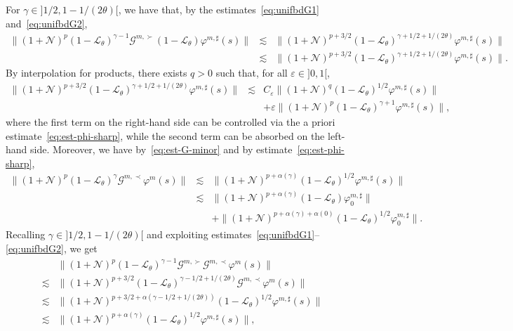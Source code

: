 \documentclass[10pt]{article}
\begin{document}
For $\gamma \in] 1 / 2, 1 - 1 / (2 \theta) [$, we have that, by the
estimates~{\eqref{eq:unifbdG1}} and~{\eqref{eq:unifbdG2}},
\begin{eqnarray*}
  \| (1 +\mathcal{N})^p (1 -\mathcal{L}_{\theta})^{\gamma - 1} \mathcal{G}^{m,
  \succ} (1 -\mathcal{L}_{\theta}) \varphi^{m, \sharp} (s) \| & \lesssim & \|
  (1 +\mathcal{N})^{p + 3 / 2} (1 -\mathcal{L}_{\theta})^{\gamma + 1 / 2 + 1 /
  (2 \theta)} \varphi^{m, \sharp} (s) \|\\
  & \lesssim & \| (1 +\mathcal{N})^{p + 3 / 2} (1
  -\mathcal{L}_{\theta})^{\gamma + 1 / 2 + 1 / (2 \theta)} \varphi^{m, \sharp}
  (s) \| .
\end{eqnarray*}
By interpolation for products, there exists $q > 0$ such that, for all
$\varepsilon \in] 0, 1 [$,
\[ \begin{array}{lll}
     \| (1 +\mathcal{N})^{p + 3 / 2} (1 -\mathcal{L}_{\theta})^{\gamma + 1 / 2
     + 1 / (2 \theta)} \varphi^{m, \sharp} (s) \| & \lesssim & C_{\varepsilon}
     \| (1 +\mathcal{N})^q (1 -\mathcal{L}_{\theta})^{1 / 2} \varphi^{m,
     \sharp} (s) \|\\
     &  & + \varepsilon \| (1 +\mathcal{N})^p (1
     -\mathcal{L}_{\theta})^{\gamma + 1} \varphi^{m, \sharp} (s) \|,
   \end{array} \]
where the first term on the right-hand side can be controlled via the a priori
estimate~{\eqref{eq:est-phi-sharp}}, while the second term can be absorbed on
the left-hand side. Moreover, we have by~{\eqref{eq:est-G-minor}} and by
estimate~{\eqref{eq:est-phi-sharp}},
\[ \begin{array}{lll}
     \| (1 +\mathcal{N})^p (1 -\mathcal{L}_{\theta})^{\gamma} \mathcal{G}^{m,
     \prec} \varphi^m (s) \| & \lesssim & \| (1 +\mathcal{N})^{p + \alpha
     (\gamma)} (1 -\mathcal{L}_{\theta})^{1 / 2} \varphi^{m, \sharp} (s) \|\\
     & \lesssim & \| (1 +\mathcal{N})^{p + \alpha (\gamma)} (1
     -\mathcal{L}_{\theta}) \varphi^{m, \sharp}_0 \|\\
     &  & + \| (1 +\mathcal{N})^{p + \alpha (\gamma) + \alpha (0)} (1
     -\mathcal{L}_{\theta})^{1 / 2} \varphi^{m, \sharp}_0 \| .
   \end{array} \]
Recalling $\gamma \in] 1 / 2, 1 - 1 / (2 \theta) [$ and exploiting
estimates~{\eqref{eq:unifbdG1}}--{\eqref{eq:unifbdG2}}, we get
\[ \begin{array}{ll}
     & \| (1 +\mathcal{N})^p (1 -\mathcal{L}_{\theta})^{\gamma - 1}
     \mathcal{G}^{m, \succ} \mathcal{G}^{m, \prec} \varphi^m (s) \|\\
     \lesssim & \| (1 +\mathcal{N})^{p + 3 / 2} (1
     -\mathcal{L}_{\theta})^{\gamma - 1 / 2 + 1 / (2 \theta)} \mathcal{G}^{m,
     \prec} \varphi^m (s) \|\\
     \lesssim & \| (1 +\mathcal{N})^{p + 3 / 2 + \alpha (\gamma - 1 / 2 + 1 /
     (2 \theta))} (1 -\mathcal{L}_{\theta})^{1 / 2} \varphi^{m, \sharp} (s)
     \|\\
     \lesssim & \| (1 +\mathcal{N})^{p + \alpha (\gamma)} (1
     -\mathcal{L}_{\theta})^{1 / 2} \varphi^{m, \sharp} (s) \|,
   \end{array} \]
\end{document}
